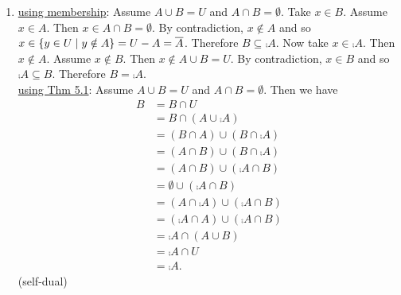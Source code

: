 \documentclass[11pt]{book}
\begin{document}
\begin{enumerate}
{\begin{enumerate}
\underline{using membership}: Assume that $A \cup B = A$ for all $A$. Then, in particular, for $A = \emptyset$ we have $A \cup B = \emptyset \cup B = \emptyset$. Take $x \in B$. Then $x \in \emptyset \cup B = \emptyset$ and so $B \subseteq \emptyset$. Now take $x \in \emptyset$. By ex falso quodlibet, we have $x \in B$. Therefore $\emptyset \subseteq B$. Thus $B = \emptyset$.\\ \underline{using Thm 5.1}: Assume that $A \cup B = A$ for all $A$. Then, in particular, $\emptyset \cup B = \emptyset$. Then \begin{align*}B &= B \cup \emptyset\tag{5.1.4}\\&= \emptyset \cup B\tag{5.1.2}\\&= \emptyset.\tag{Consequence of assumption}\end{align*} Therefore $B = \emptyset$.\\ \underline{dual proof}: Assume that $A \cap B = A$ for all $A$. Then, in particular, $U \cap B = U$. Then \begin{align*}B &= B \cap U\tag{5.1.4'}\\&= U \cap B\tag{5.1.2'}\\&= U.\tag{Consequence of assumption}\end{align*} Therefore $B = U$.
\item %
\underline{using membership}: Assume $A \cup B = U$ and $A \cap B = \emptyset$. Take $x \in B$. Assume $x \in A$. Then $x \in A \cap B = \emptyset$. By contradiction, $x \notin A$ and so $x \in \{y \in U \mid y \notin A\} = U - A = \overline{A}$. Therefore $B \subseteq \comp{A}$. Now take $x \in \comp{A}$. Then $x \notin A$. Assume $x \notin B$. Then $x \notin A \cup B = U$. By contradiction, $x \in B$ and so $\comp{A} \subseteq B$. Therefore $B = \comp{A}$.\\ 
\underline{using Thm 5.1}: Assume $A \cup B = U$ and $A \cap B = \emptyset$. Then we have \begin{align*}B &= B \cap U \tag{5.1.4'}\\&= B \cap (A \cup \comp{A})\tag{5.1.5}\\&= (B \cap A) \cup (B \cap \comp{A})\tag{5.1.3'}\\&= (A \cap B) \cup (B \cap \comp{A})\tag{5.1.2'}\\&=(A \cap B) \cup (\comp{A} \cap B)\tag{5.1.2'}\\&= \emptyset \cup (\comp{A} \cap B) \tag{Assumption}\\&= (A \cap \comp{A}) \cup (\comp{A} \cap B)\tag{5.1.5'}\\&= (\comp{A} \cap A) \cup (\comp{A} \cap B)\tag{5.1.2'}\\&= \comp{A} \cap (A \cup B)\tag{5.1.3'}\\&= \comp{A} \cap U\tag{Assumption}\\&= \comp{A}.\tag{5.1.4'}\end{align*}(self-dual)

\end{enumerate}}
\end{enumerate}
\end{document}
